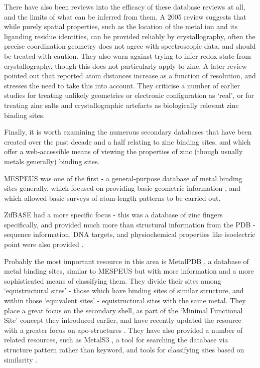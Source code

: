There have also been reviews into the efficacy of these database reviews at all, and the limits of what can be inferred from them. A 2005 review \cite{sommerhalter2005x} suggests that while purely spatial properties, such as the location of the metal ion and its liganding residue identities, can be provided reliably by crystallography, often the precise coordination geometry does not agree with spectroscopic data, and should be treated with caution. They also warn against trying to infer redox state from crystallography, though this does not particularly apply to zinc. A later review \cite{laitaoja2013zinc} pointed out that reported atom distances increase as a function of resolution, and stresses the need to take this into account. They criticise a number of earlier studies for treating unlikely geometries or electronic configuration as `real', or for treating zinc salts and crystallographic artefacts as biologically relevant zinc binding sites.

Finally, it is worth examining the numerous secondary databases that have been created over the past decade and a half relating to zinc binding sites, and which offer a web-accessible means of viewing the properties of zinc (though usually metals generally) binding sites.

MESPEUS was one of the first - a general-purpose database of metal binding sites generally, which focused on providing basic geometric information \cite{hsin2008mespeus}, and which allowed basic surveys of atom-length patterns to be carried out.

ZifBASE had a more specific focus - this was a database of zinc fingers specifically, and provided much more than structural information from the PDB - sequence information, DNA targets, and physiochemical properties like isoelectric point were also provided \cite{jayakanthan2009zifbase}.

Probably the most important resource in this area is MetalPDB \cite{andreini2012metalpdb}, a database of metal binding sites, similar to MESPEUS but with more information and a more sophisticated means of classifying them. They divide their sites among `equistructural sites' - those which have binding sites of similar structure, and within those `equivalent sites' - equistructural sites with the same metal. They place a great focus on the secondary shell, as part of the `Minimal Functional Site' concept they introduced earlier, and have recently updated the resource with a greater focus on apo-structures \cite{putignano2017metalpdb}. They have also provided a number of related resources, such as MetalS3 \cite{valasatava2014metals}, a tool for searching the database via structure pattern rather than keyword, and tools for classifying sites based on similarity \cite{sobolev2013web}.

